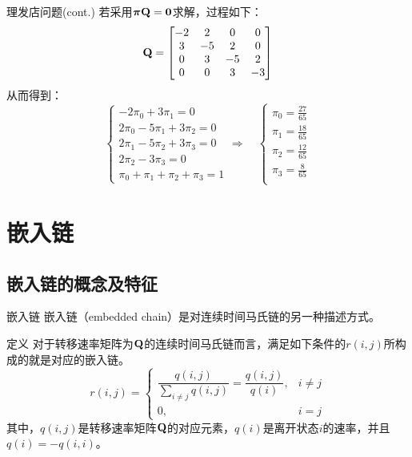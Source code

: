 \documentclass[t]{beamer}
\begin{document}
\begin{frame}{理发店问题(cont.)}\small
  若采用${\bm{\pi}}{\bf Q}={\bf 0}$求解，过程如下：
  \[{\bf Q}=\begin{bmatrix}
  -2 & 2 & 0&0\\
  3&-5&2&0\\
  0&3&-5&2\\
  0&0&3&-3
  \end{bmatrix} \]
  从而得到：
  \[\begin{cases}
  -2\pi_0+3\pi_1=0\\
  2\pi_0-5\pi_1+3\pi_2=0\\
  2\pi_1-5\pi_2+3\pi_3=0\\
  2\pi_2-3\pi_3=0\\
  \pi_0+\pi_1+\pi_2+\pi_3=1
  \end{cases}\Rightarrow\quad 
  \begin{cases}
   \pi_0=\frac{27}{65}\\
   \pi_1=\frac{18}{65}\\
   \pi_2=\frac{12}{65}\\
  \pi_3=\frac{8}{65}\\
  \end{cases}
  \]	
\end{frame}

\section{嵌入链}

\subsection{嵌入链的概念及特征}

\begin{frame}{嵌入链}
  嵌入链（embedded chain）是对连续时间马氏链的另一种描述方式。

  \begin{block}{定义}
    对于转移速率矩阵为$\bf Q$的连续时间马氏链而言，满足如下条件的$r(i,j)$所构成的就是对应的嵌入链。
\begin{equation*}
r(i,j)=\begin{cases}
\dfrac{q(i,j)}{\sum_{i\ne j}q(i,j) }= \dfrac{q(i,j)}{q(i)},& i\ne j\\
0,& i=j
\end{cases}
\end{equation*}
其中，$q(i,j)$是转移速率矩阵$\bf Q$的对应元素，$q(i)$是离开状态$i$的速率，并且$q(i)=-q(i,i)$。
  \end{block}
\end{frame}
\end{document}
